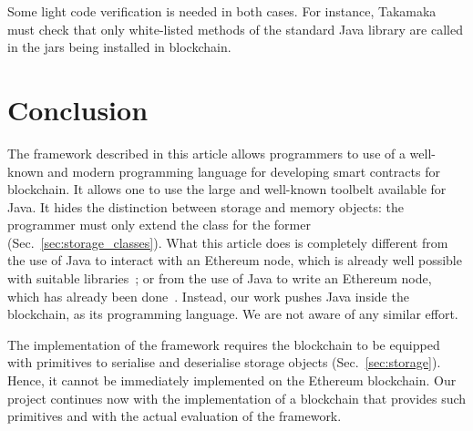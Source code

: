 \documentclass[10pt]{llncs}
\def\codesize{}
\def\<#1>{\codeid{#1}}
\newcommand{\codeid}[1]{\ifmmode{\mbox{\codesize\ttfamily{#1}}}\else{\codesize\ttfamily #1}\fi}
\begin{document}
Some light code verification is needed in both cases.
For instance, Takamaka must check that only white-listed methods of the standard
Java library are called in the jars being installed in blockchain.

\section{Conclusion}\label{sec:conclusion}

The framework described in this article allows programmers
to use of a well-known
and modern programming language for developing smart contracts
for blockchain.
It allows one to use the large and well-known toolbelt available for Java.
It hides the distinction between storage and memory
objects: the programmer must only extend the \<Storage> class for the
former (Sec.~\ref{sec:storage_classes}).
What this article does is completely different from the use of Java
to interact with an Ethereum node, which is already well possible
with suitable libraries~\cite{web3j}; or from the use of Java to
write an Ethereum node, which has already been done~\cite{ethereumj}.
Instead, our work pushes Java inside the blockchain, as its programming
language. We are not aware of any similar effort.

The implementation of the framework requires the blockchain to be
equipped with primitives to serialise and deserialise storage objects
(Sec.~\ref{sec:storage}). Hence, it cannot be immediately implemented on
the Ethereum blockchain. Our project continues now with the
implementation of a blockchain that provides such primitives
and with the actual evaluation of the framework.




\end{document}
